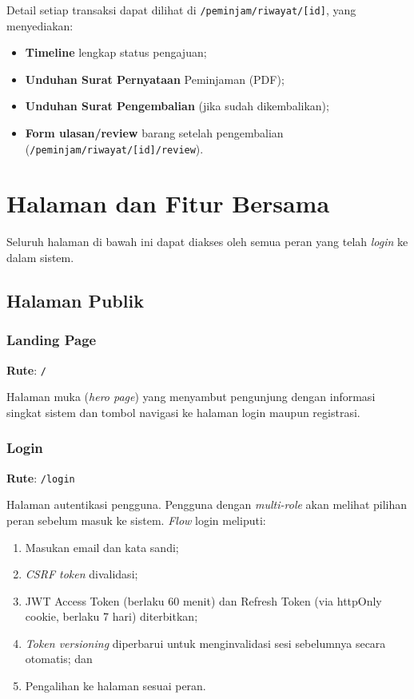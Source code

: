 \documentclass[
  12pt,
  a4paper,
  oneside,
  final
]{report}
\begin{document}
Detail setiap transaksi dapat dilihat di
\texttt{/peminjam/riwayat/[id]}, yang menyediakan:
\begin{itemize}
  \item {\bfseries Timeline} lengkap status pengajuan;
  \item {\bfseries Unduhan Surat Pernyataan} Peminjaman (PDF);
  \item {\bfseries Unduhan Surat Pengembalian} (jika sudah dikembalikan);
  \item {\bfseries Form ulasan/review} barang setelah pengembalian
        (\texttt{/peminjam/riwayat/[id]/review}).
\end{itemize}

\chapter{Halaman dan Fitur Bersama}

Seluruh halaman di bawah ini dapat diakses oleh semua peran yang
telah {\it login} ke dalam sistem.

\section{Halaman Publik}

\subsection{Landing Page}
\textbf{Rute}: \texttt{/}

Halaman muka ({\it hero page}) yang menyambut pengunjung dengan
informasi singkat sistem dan tombol navigasi ke halaman login
maupun registrasi.

\subsection{Login}
\textbf{Rute}: \texttt{/login}

Halaman autentikasi pengguna. Pengguna dengan {\it multi-role}
akan melihat pilihan peran sebelum masuk ke sistem. {\it Flow}
login meliputi:
\begin{enumerate}
  \item Masukan email dan kata sandi;
  \item {\it CSRF token} divalidasi;
  \item JWT Access Token (berlaku 60 menit) dan Refresh Token
        (via httpOnly cookie, berlaku 7 hari) diterbitkan;
  \item {\it Token versioning} diperbarui untuk menginvalidasi
        sesi sebelumnya secara otomatis; dan
  \item Pengalihan ke halaman sesuai peran.
\end{enumerate}
\end{document}
